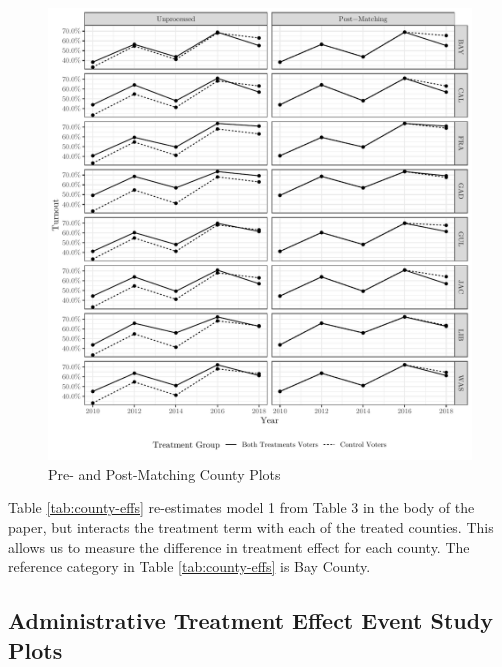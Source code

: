 \documentclass[
  12pt,
]{article}
\begin{document}
\begin{figure}[H]

{\centering \includegraphics{si_files/figure-latex/indcs-chunk-1} 

}

\caption{\label{fig:ind-counties}Pre- and Post-Matching County Plots}\label{fig:indcs-chunk}
\end{figure}

Table \ref{tab:county-effs} re-estimates model 1 from Table 3 in the body of the paper, but interacts the treatment term with each of the treated counties. This allows us to measure the difference in treatment effect for each county. The reference category in Table \ref{tab:county-effs} is Bay County.

\begin{singlespace}

\end{singlespace}

\hypertarget{administrative-treatment-effect-event-study-plots}{%
\subsection*{Administrative Treatment Effect Event Study Plots}\label{administrative-treatment-effect-event-study-plots}}
\end{document}
